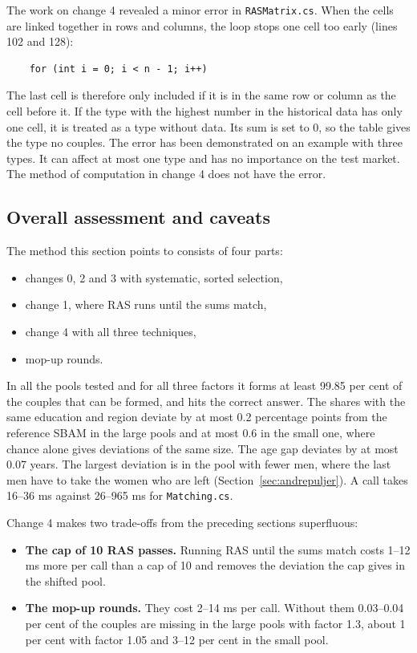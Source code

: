 \documentclass[12pt,a4paper]{article}
\newcommand{\kode}[1]{\texttt{#1}}
\begin{document}
The work on change 4 revealed a minor error in \kode{RASMatrix.cs}. When the cells are linked
together in rows and columns, the loop stops one cell too early (lines 102 and 128):

{\small
\begin{verbatim}
    for (int i = 0; i < n - 1; i++)
\end{verbatim}
}

The last cell is therefore only included if it is in the same row or column as the cell before it.
If the type with the highest number in the historical data has only one cell, it is treated as a
type without data. Its sum is set to 0, so the table gives the type no couples. The error has been
demonstrated on an example with three types. It can affect at most one type and has no importance
on the test market. The method of computation in change 4 does not have the error.

\subsection{Overall assessment and caveats}\label{sec:nyforbehold}

The method this section points to consists of four parts:

\begin{itemize}
\item changes 0, 2 and 3 with systematic, sorted selection,
\item change 1, where RAS runs until the sums match,
\item change 4 with all three techniques,
\item mop-up rounds.
\end{itemize}

In all the pools tested and for all three factors it forms at least 99.85 per cent of the couples
that can be formed, and hits the correct answer. The shares with the same education and region
deviate by at most 0.2 percentage points from the reference SBAM in the large pools and at most 0.6
in the small one, where chance alone gives deviations of the same size. The age gap deviates by at
most 0.07 years. The largest deviation is in the pool with fewer men, where the last men have to
take the women who are left (Section~\ref{sec:andrepuljer}). A call takes 16--36 ms against
26--965 ms for \kode{Matching.cs}.

Change 4 makes two trade-offs from the preceding sections superfluous:

\begin{itemize}
\item \textbf{The cap of 10 RAS passes.} Running RAS until the sums match costs 1--12 ms more per
call than a cap of 10 and removes the deviation the cap gives in the shifted pool.
\item \textbf{The mop-up rounds.} They cost 2--14 ms per call. Without them 0.03--0.04 per cent of
the couples are missing in the large pools with factor 1.3, about 1 per cent with factor 1.05 and
3--12 per cent in the small pool.
\end{itemize}
\end{document}
